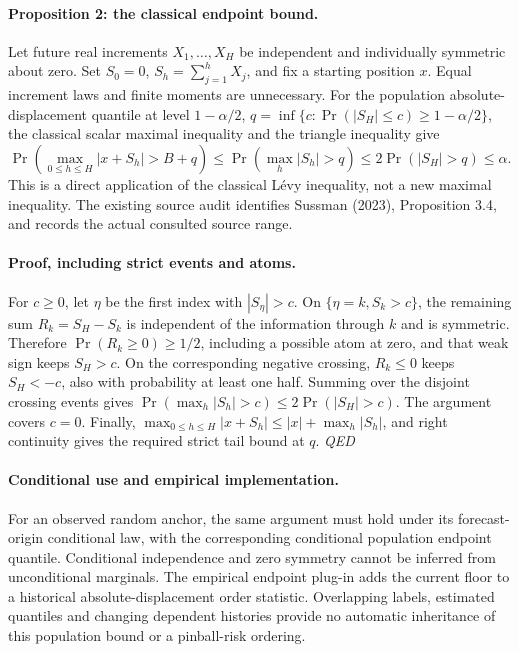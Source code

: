 \documentclass[11pt,a4paper]{article}
\begin{document}
\paragraph{Proposition 2: the classical endpoint bound.}
Let future real increments \(X_1,\ldots,X_H\) be independent and individually
symmetric about zero. Set \(S_0=0\), \(S_h=\sum_{j=1}^hX_j\), and fix a starting
position \(x\). Equal increment laws and finite moments are unnecessary.
For the population absolute-displacement quantile at level \(1-\alpha/2\),
\(q=\inf\{c:\Pr(|S_H|\le c)\ge1-\alpha/2\}\), the classical scalar maximal
inequality and the triangle inequality give
\[
\Pr\!\left(\max_{0\le h\le H}|x+S_h|>B+q\right)\le\Pr\!\left(\max_h|S_h|>q\right)\le2\Pr(|S_H|>q)\le\alpha.
\]
This is a direct application of the classical L\'evy inequality, not a new
maximal inequality. The existing source audit identifies Sussman (2023),
Proposition 3.4, and records the actual consulted source range.

\paragraph{Proof, including strict events and atoms.}
For \(c\ge0\), let \(\eta\) be the first index with \(|S_\eta|>c\). On
\(\{\eta=k,S_k>c\}\), the remaining sum \(R_k=S_H-S_k\) is independent of
the information through \(k\) and is symmetric. Therefore \(\Pr(R_k\ge0)\ge1/2\),
including a possible atom at zero, and that weak sign keeps \(S_H>c\).
On the corresponding negative crossing, \(R_k\le0\) keeps \(S_H<-c\), also
with probability at least one half. Summing over the disjoint crossing events
gives \(\Pr(\max_h|S_h|>c)\le2\Pr(|S_H|>c)\). The argument covers \(c=0\).
Finally, \(\max_{0\le h\le H}|x+S_h|\le |x|+\max_h|S_h|\), and right
continuity gives the required strict tail bound at \(q\). \hfill\textit{QED}

\paragraph{Conditional use and empirical implementation.}
For an observed random anchor, the same argument must hold under its
forecast-origin conditional law, with the corresponding conditional population
endpoint quantile. Conditional independence and zero symmetry cannot be inferred
from unconditional marginals. The empirical endpoint plug-in adds the current
floor to a historical absolute-displacement order statistic. Overlapping labels,
estimated quantiles and changing dependent histories provide no automatic
inheritance of this population bound or a pinball-risk ordering.
\end{document}
